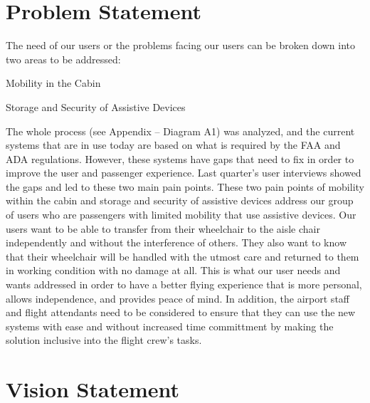 \section{Problem Statement}
The need of our users or the problems facing our users can be broken down into two areas to be addressed:

\begin{list}{-}{}
  \item Mobility in the Cabin
  \item Storage and Security of Assistive Devices
\end{list}

The whole process (see Appendix – Diagram A1) was analyzed, and the current systems that are in use today are based on what is required by the FAA and ADA regulations.  However, these systems have gaps that need to fix in order to improve the user and passenger experience.  Last quarter’s user interviews showed the gaps and led to these two main pain points. These two pain points of mobility within the cabin and storage and security of assistive devices address our group of users who are passengers with limited mobility that use assistive devices.  Our users want to be able to transfer from their wheelchair to the aisle chair independently and without the interference of others.  They also want to know that their wheelchair will be handled with the utmost care and returned to them in working condition with no damage at all.   This is what our user needs and wants addressed in order to have a better flying experience that is more personal, allows independence, and provides peace of mind. In addition, the airport staff and flight attendants need to be considered to ensure that they can use the new systems with ease and without increased time committment by making the solution inclusive into the flight crew's tasks.


\section{Vision Statement}

